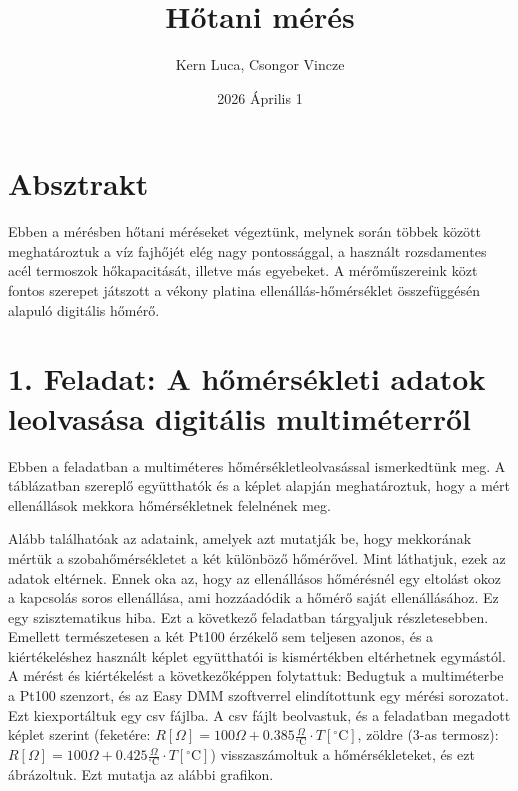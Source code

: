 \documentclass{article}
\title{Hőtani mérés}
\author{Kern Luca, Csongor Vincze}
\date{2026 Április 1}
\begin{document}
\maketitle

\section*{Absztrakt}

Ebben a mérésben hőtani méréseket végeztünk, melynek során többek között meghatároztuk a víz fajhőjét elég nagy pontossággal, a használt rozsdamentes acél termoszok hőkapacitását, illetve más egyebeket. A mérőműszereink közt fontos szerepet játszott a vékony platina ellenállás-hőmérséklet összefüggésén alapuló digitális hőmérő.

\section*{1. Feladat: A hőmérsékleti adatok leolvasása digitális multiméterről}

Ebben a feladatban a multiméteres hőmérsékletleolvasással ismerkedtünk meg. A táblázatban szereplő együtthatók és a képlet alapján meghatároztuk, hogy a mért ellenállások mekkora hőmérsékletnek felelnének meg.

Alább találhatóak az adataink, amelyek azt mutatják be, hogy mekkorának mértük a szobahőmérsékletet a két különböző hőmérővel. Mint láthatjuk, ezek az adatok eltérnek. Ennek oka az, hogy az ellenállásos hőmérésnél egy eltolást okoz a kapcsolás soros ellenállása, ami hozzáadódik a hőmérő saját ellenállásához. Ez egy szisztematikus hiba. Ezt a következő feladatban tárgyaljuk részletesebben. Emellett természetesen a két Pt100 érzékelő sem teljesen azonos, és a kiértékeléshez használt képlet együtthatói is kismértékben eltérhetnek egymástól.
A mérést és kiértékelést a következőképpen folytattuk: Bedugtuk a multiméterbe a Pt100 szenzort, és az Easy DMM szoftverrel elindítottunk egy mérési sorozatot. Ezt kiexportáltuk egy csv fájlba. A csv fájlt beolvastuk, és a feladatban megadott képlet szerint (feketére: $ R[\Omega]=100 \Omega+0.385 \frac{\Omega}{{ }^{\circ} \mathrm{C}} \cdot T\left[{ }^{\circ} \mathrm{C}\right] $, zöldre (3-as termosz): $ R[\Omega]=100 \Omega+0.425 \frac{\Omega}{{ }^{\circ} \mathrm{C}} \cdot T\left[{ }^{\circ} \mathrm{C}\right] $) visszaszámoltuk a hőmérsékleteket, és ezt ábrázoltuk. Ezt mutatja az alábbi grafikon.

\end{document}
